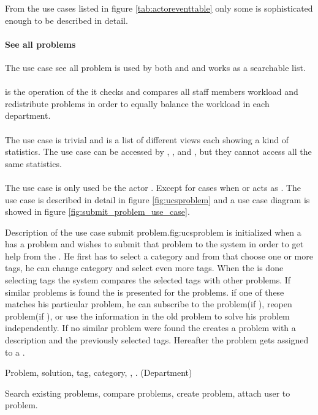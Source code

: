 From the use cases listed in figure \ref{tab:actoreventtable} only some is sophisticated enough to be described in detail.  


\paragraph{See all problems} The use case see all problem is used by both \aclient{} and \astaff{} and works as a searchable list. 

\paragraph{\bloadwork[c]} \bloadwork[c] is the operation of the \wmon{} it checks and compares all staff members workload and redistribute problems in order to equally balance the workload in each department. 

\paragraph{\gstat[c]} The use case \gstat[] is trivial and is a list of different views each showing a kind of statistics. The use case can be accessed by \sadmin{}, \aclient{}, and \astaff{}, but they cannot access all the same statistics.

\paragraph{\ucsproblem[c]} The use case \ucsproblem[] is only used be the actor \aclient. Except for cases when \astaff{} or \sadmin{}  acts as \aclient{}. The use case is described in detail in figure \ref{fig:ucsproblem} and a use case diagram is showed in figure \ref{fig:submit_problem_use_case}. 


\begin{sadlist}[h]{\ucsproblem[c]}{Description of the use case submit problem.}{fig:ucsproblem}
 \ucsproblem[c] is initialized when a \aclient{} has a problem and wishes to submit that problem to the system in order to get help from the \astaff{}. 
He first has to select a category and from that choose one or more tags, he can change category and select even more tags. 
When the \aclient{} is done selecting tags the system compares the selected tags with other problems. 
If similar problems is found the \aclient{} is presented for the problems.
if one of these matches his particular problem, he can subscribe to the problem(if \open), reopen problem(if \closed{}), or use the information in the old problem to solve his problem independently. 
If no similar problem were found the \aclient{} creates a problem with a description and the previously selected tags. 
Hereafter the problem gets assigned to a \astaff{}. 

 Problem, solution, tag, category, \client, \staff. (Department)

 Search existing problems, compare problems, create problem, attach user to problem.
\end{sadlist}


